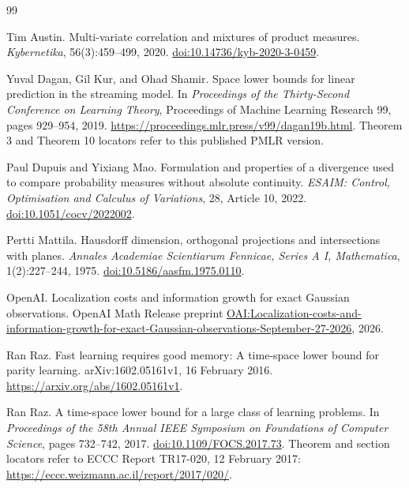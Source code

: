 \begin{thebibliography}{99}

Tim Austin.
\newblock Multi-variate correlation and mixtures of product measures.
\newblock \emph{Kybernetika}, 56(3):459--499, 2020.
\newblock \href{https://doi.org/10.14736/kyb-2020-3-0459}{doi:10.14736/kyb-2020-3-0459}.

Yuval Dagan, Gil Kur, and Ohad Shamir.
\newblock Space lower bounds for linear prediction in the streaming model.
\newblock In \emph{Proceedings of the Thirty-Second Conference on Learning Theory},
Proceedings of Machine Learning Research 99, pages 929--954, 2019.
\newblock \url{https://proceedings.mlr.press/v99/dagan19b.html}.
Theorem 3 and Theorem 10 locators refer to this published PMLR version.

Paul Dupuis and Yixiang Mao.
\newblock Formulation and properties of a divergence used to compare
probability measures without absolute continuity.
\newblock \emph{ESAIM: Control, Optimisation and Calculus of Variations},
28, Article 10, 2022.
\newblock \href{https://doi.org/10.1051/cocv/2022002}{doi:10.1051/cocv/2022002}.

Pertti Mattila.
\newblock Hausdorff dimension, orthogonal projections and intersections with planes.
\newblock \emph{Annales Academiae Scientiarum Fennicae, Series A I, Mathematica},
1(2):227--244, 1975.
\newblock \href{https://doi.org/10.5186/aasfm.1975.0110}{doi:10.5186/aasfm.1975.0110}.

OpenAI.
\newblock Localization costs and information growth for exact Gaussian observations.
\newblock OpenAI Math Release preprint
\href{https://github.com/openai/math/blob/main/preprints/Localization-costs-and-information-growth-for-exact-Gaussian-observations-September-27-2026/paper.pdf}{OAI:Localization-costs-and-information-growth-for-exact-Gaussian-observations-September-27-2026}, 2026.

Ran Raz.
\newblock Fast learning requires good memory: A time-space lower bound for parity learning.
\newblock arXiv:1602.05161v1, 16 February 2016.
\newblock \url{https://arxiv.org/abs/1602.05161v1}.

Ran Raz.
\newblock A time-space lower bound for a large class of learning problems.
\newblock In \emph{Proceedings of the 58th Annual IEEE Symposium on Foundations
of Computer Science}, pages 732--742, 2017.
\newblock \href{https://doi.org/10.1109/FOCS.2017.73}{doi:10.1109/FOCS.2017.73}.
Theorem and section locators refer to ECCC Report TR17-020, 12 February 2017:
\url{https://eccc.weizmann.ac.il/report/2017/020/}.


\end{thebibliography}
